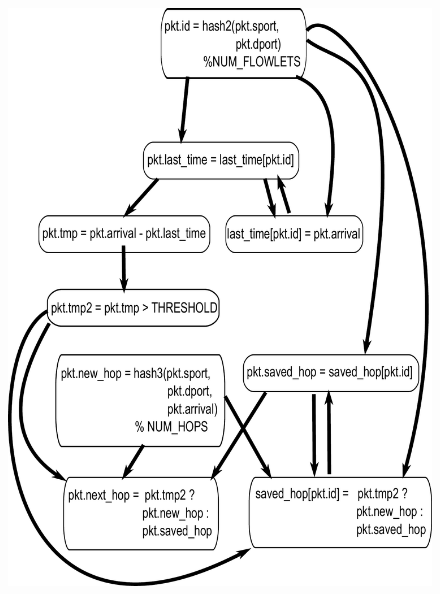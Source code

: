 \begin{figure}[!t]
\begin{minipage}{0.5\textwidth}
  \includegraphics[width=\columnwidth]{deps.pdf}
\end{minipage}
%
\vrule\quad
%
\begin{minipage}{0.5\textwidth}

\end{minipage}
\end{figure}
